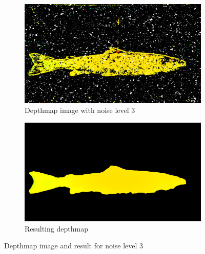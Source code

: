 \begin{figure}[h]
    \centering
    \begin{subfigure}{1\textwidth}
        \centering
        \includegraphics[width=.7\linewidth]{images/implementation/noise_level_3/1_original}
        \caption{Depthmap image with noise level 3} 
        \label{fig:noise_level_3_original}
    \end{subfigure}\hspace*{\fill}
    
    \medskip
    \begin{subfigure}{1\textwidth}
        \centering
        \includegraphics[width=.7\linewidth]{images/implementation/noise_level_3/7_median_filter}
        \caption{Resulting depthmap} 
        \label{fig:noise_level_3_result}
    \end{subfigure}\hspace*{\fill}
    \caption{Depthmap image and result for noise level 3}
    \label{fig:noise_level_3}
\end{figure}
